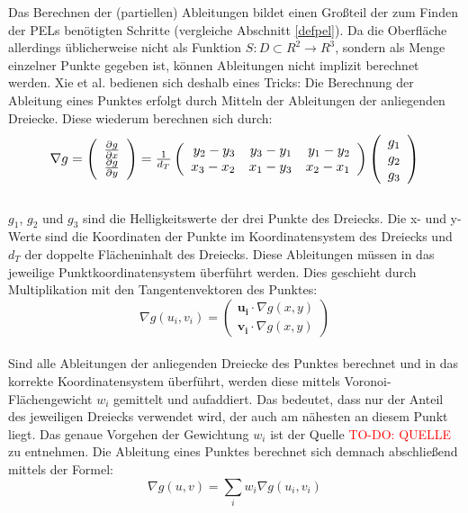 \documentclass{paperStyle}
\newcommand\todo[1]{\textcolor{red}{#1}}
\begin{document}
Das Berechnen der (partiellen) Ableitungen bildet einen Großteil der zum Finden der PELs benötigten Schritte (vergleiche Abschnitt \ref{defpel}). Da die Oberfläche allerdings üblicherweise nicht als Funktion $S : D \subset R^{2} \longrightarrow R^{3}$, sondern als Menge einzelner Punkte gegeben ist, können Ableitungen nicht implizit berechnet werden. Xie et al. bedienen sich deshalb eines Tricks:
Die Berechnung der Ableitung eines Punktes erfolgt durch Mitteln der Ableitungen der anliegenden Dreiecke. Diese wiederum berechnen sich durch:
\begin{equation}
\resizebox{.85\hsize}{!}{$\nabla g = \left(\begin{array}{c}\frac{\partial g}{\partial x} \\ \frac{\partial g}{\partial y}\end{array}\right) = \frac{1}{d_{T}} \left(\begin{array}{rrr}y_{2}-y_{3} & y_{3}-y_{1} & y_{1}-y_{2} \\ x_{3}-x_{2} & x_{1}-y_{3} & x_{2}-x_{1}\end{array}\right) \left(\begin{array}{c}g_{1} \\ g_{2} \\ g_{3}\end{array}\right)$}
\label{eq:derivativepel}
\end{equation}
\\
$g_{1}$, $g_{2}$ und $g_{3}$ sind die Helligkeitswerte der drei Punkte des Dreiecks. Die x- und y-Werte sind die Koordinaten der Punkte im Koordinatensystem des Dreiecks und $d_{T}$ der doppelte Flächeninhalt des Dreiecks. Diese Ableitungen müssen in das jeweilige Punktkoordinatensystem überführt werden. Dies geschieht durch Multiplikation mit den Tangentenvektoren des Punktes:
\begin{equation}
\nabla g(u_{i},v_{i}) = \left(\begin{array}{c}\mathbf{u_{i}} \cdot \nabla g(x,y) \\ \mathbf{v_{i}} \cdot \nabla g(x,y)\end{array}\right)
\label{guivui}
\end{equation}
\\
Sind alle Ableitungen der anliegenden Dreiecke des Punktes berechnet und in das korrekte Koordinatensystem überführt, werden diese mittels Voronoi-Flächengewicht $w_{i}$ gemittelt und aufaddiert. Das bedeutet, dass nur der Anteil des jeweiligen Dreiecks verwendet wird, der auch am nähesten an diesem Punkt liegt. Das genaue Vorgehen der Gewichtung $w_{i}$ ist der Quelle \todo{TO-DO: QUELLE} zu entnehmen.
Die Ableitung eines Punktes berechnet sich demnach abschließend mittels der Formel:
 \begin{equation}
\nabla g(u,v) = \sum_{i} w_{i} \nabla g(u_{i},v_{i})
\label{guvl}
\end{equation}
 
\end{document}
